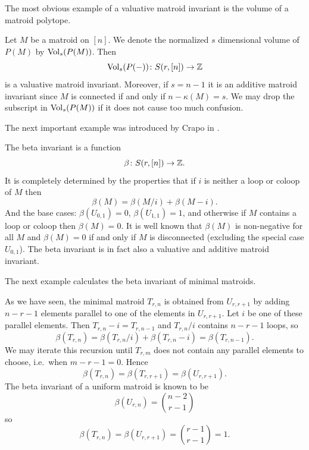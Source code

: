  The most obvious example of a valuative matroid invariant is the volume of a matroid polytope.
 \begin{example}
      Let $M$ be a matroid on $[n]$. We denote the normalized $s$ dimensional volume of $P(M)$ by $\operatorname{\mathrm{Vol}}_s(P(M))$. Then
     \begin{equation*}
         \operatorname{\mathrm{Vol}}_s(P(-))\colon S(r,[n]) \to {\mathbb Z}
     \end{equation*}
     is a valuative matroid invariant. Moreover, if $s = n-1$ it is an additive matroid invariant since $M$ is connected if and only if $n-\kappa(M) = s$. We may drop the subscript in $\operatorname{\mathrm{Vol}}_s(P(M))$ if it does not cause too much confusion.
\end{example}
The next important example was introduced by Crapo in \cite{Crapo}.
\begin{example}
    The beta invariant is a function 
    \begin{equation*}
        \beta \colon S(r,[n]) \to {\mathbb Z}.
    \end{equation*}
    It is completely determined by the properties that if $i$ is neither a loop or coloop of $M$ then
    \begin{equation*}
        \beta(M) = \beta(M/i) + \beta(M\minus i).
    \end{equation*}
    And the base cases: \(\beta(U_{0,1}) = 0\), \(\beta(U_{1,1}) = 1\), and otherwise if $M$ contains a loop or coloop then $\beta(M) = 0$.
    It is well known that $\beta(M)$ is non-negative for all $M$ and $\beta(M) = 0$ if and only if $M$ is disconnected (excluding the special case $U_{0,1}$). The beta invariant is in fact also a valuative and additive matroid invariant.
\end{example}

The next example calculates the beta invariant of minimal matroids.
\begin{example}
    As we have seen, the minimal matroid $T_{r,n}$ is obtained from $U_{r,r+1}$ by adding $n-r-1$ elements parallel to one of the elements in $U_{r,r+1}$. Let $i$ be one of these parallel elements. Then $T_{r,n} \minus i = T_{r,n-1}$ and $T_{r,n}/i$ contains $n-r-1$ loops, so
    \begin{equation*}
        \beta(T_{r,n}) = \beta(T_{r,n}/i) + \beta(T_{r,n} \minus i) = \beta(T_{r,n-1}).
    \end{equation*}
    We may iterate this recursion until $T_{r,m}$ does not contain any parallel elements to choose, i.e.\ when $m-r-1 = 0$. Hence
    \begin{equation*}
        \beta(T_{r,n}) = \beta(T_{r,r+1}) = \beta(U_{r,r+1}).
    \end{equation*}
    The beta invariant of a uniform matroid is known to be
    \begin{equation*}
        \beta(U_{r,n}) = \binom{n-2}{r-1}
    \end{equation*}
    so
    \begin{equation*}
        \beta(T_{r,n}) = \beta(U_{r,r+1}) = \binom{r-1}{r-1} = 1.
    \end{equation*}
\end{example}

